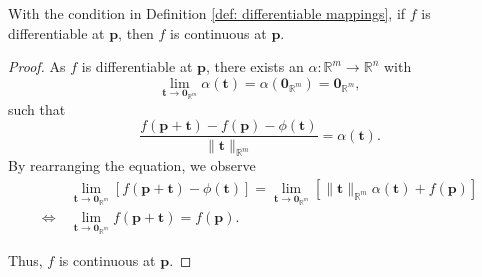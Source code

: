 \begin{theorem}
	\label{thm: differentiable mappings: implies continuity}
	With the condition in Definition \ref{def: differentiable mappings}, if $f$ is differentiable at $\mathbf p$, then $f$ is continuous at $\mathbf p$.
	
	\begin{proof}
		As $f$ is differentiable at $\mathbf p$, there exists an $\alpha: \mathbb R^m \to \mathbb R^n$ with
		$$
		\lim_{\mathbf t \to \mathbf 0_{\mathbb R^m}} \alpha(\mathbf t) = \alpha(\mathbf 0_{\mathbb R^m}) = \mathbf 0_{\mathbb R^m},
		$$
		such that
		$$
		\frac{f(\mathbf p + \mathbf t) - f(\mathbf p) - \phi(\mathbf t)}{\| \mathbf t \|_{\mathbb R^m}} = \alpha(\mathbf t).
		$$
		By rearranging the equation, we observe
		$$
		\begin{aligned}
		& \ \lim_{\mathbf t \to \mathbf 0_{\mathbb R^m}}[f(\mathbf p + \mathbf t) - \phi(\mathbf t)] = \lim_{\mathbf t \to \mathbf 0_{\mathbb R^m}} [\| \mathbf t \|_{\mathbb R^m}\alpha(\mathbf t) + f(\mathbf p)] \\
		\iff & \ \lim_{\mathbf t \to \mathbf 0_{\mathbb R^m}} f(\mathbf p + \mathbf t) = f(\mathbf p).
		\end{aligned}
		$$
		
		Thus, $f$ is continuous at $\mathbf p$.
	\end{proof}
\end{theorem}


